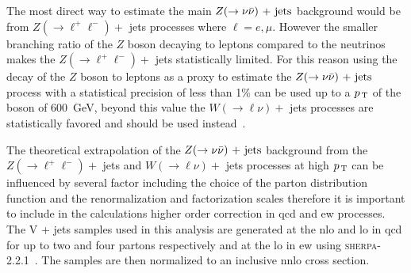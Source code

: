 The most direct way to estimate the main $Z (\rightarrow \nu \bar{\nu})\mathrm{~+~jets}$ background would be
from $Z (\rightarrow \ell^+ \ell^-) +$ jets processes where $\ell = e, \mu$.
However the smaller branching ratio of the $Z$ boson decaying to leptons
compared to the neutrinos makes the $Z (\rightarrow \ell^+ \ell^-) +$ jets
statistically limited. For this reason using the decay of the $Z$ boson to
leptons as a proxy to estimate the $Z (\rightarrow \nu \bar{\nu})\mathrm{~+~jets}$ process with a statistical
precision of less than 1\% can be used up to a $p_\mathrm{\, T}$ of the boson of 600~GeV,
beyond this value the $W(\rightarrow \ell \nu) +$ jets processes are
statistically favored and should be used instead~\cite{VplusJetsCorrections}.

The theoretical extrapolation of the $Z (\rightarrow \nu \bar{\nu})\mathrm{~+~jets}$ background from the
$Z (\rightarrow \ell^+ \ell^-) +$ jets and $W(\rightarrow \ell \nu) +$ jets
processes at high $p_\mathrm{\, T}$ can be influenced by several factor including the choice
of the parton distribution function and the renormalization and factorization
scales therefore it is important to include in the calculations higher order
correction in \gls{qcd} and \gls{ew} processes. The V + jets samples used in
this analysis are generated at the \gls{nlo} and \gls{lo} in \gls{qcd} for up to
two and four partons respectively and at the \gls{lo} in \gls{ew} using
\textsc{sherpa-2.2.1}~\cite{SHERPAGenerator}. The samples are then normalized to
an inclusive \gls{nnlo} cross section.

